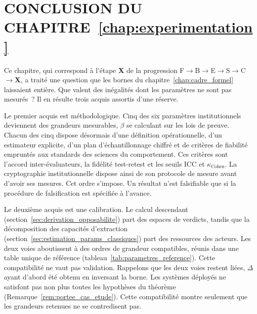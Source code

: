 
\section{CONCLUSION DU CHAPITRE~\ref{chap:experimentation}}
\label{sec:conclusion_experimentation}
\begin{sloppypar}

Ce chapitre, qui correspond \`a l'\'etape \textbf{X} de la progression
F$\to$B$\to$E$\to$S$\to$C$\to$\textbf{X}, a trait\'e une question que les bornes du
chapitre~\ref{chap:cadre_formel} laissaient enti\`ere. Que valent des
in\'egalit\'es dont les param\`etres ne sont pas mesur\'es~? Il en r\'esulte trois acquis
assortis d'une r\'eserve.

Le premier acquis est m\'ethodologique. Cinq des six param\`etres
institutionnels deviennent des grandeurs mesurables, $\beta$ se calculant sur les lois de preuve. Chacun des cinq dispose
d\'esormais d'une d\'efinition op\'erationnelle, d'un estimateur explicite,
d'un plan d'\'echantillonnage chiffr\'e et de crit\`eres de fiabilit\'e
emprunt\'es aux standards des sciences du comportement. Ces crit\`eres sont l'accord
inter-\'evaluateurs, la fid\'elit\'e test-retest et les seuils ICC et $\kappa_{\mathrm{Cohen}}$. La
cryptographie institutionnelle dispose ainsi de son protocole de mesure avant
d'avoir ses mesures. Cet ordre s'impose. Un r\'esultat n'est
falsifiable que si la proc\'edure de falsification est sp\'ecifi\'ee \`a
l'avance.

Le deuxi\`eme acquis est une calibration. Le calcul descendant
(section~\ref{sec:derivation_opposabilite}) part des espaces de verdicts, tandis
que la d\'ecomposition des capacit\'es d'extraction
(section~\ref{sec:estimation_params_classiques}) part des ressources des
acteurs. Les deux voies aboutissent \`a des ordres de grandeur compatibles, r\'eunis dans une
table unique de r\'ef\'erence (tableau~\ref{tab:parametres_reference}). Cette
compatibilit\'e ne vaut pas validation. Rappelons que les deux voies restent li\'ees, $\Delta$ ayant d'abord \'et\'e
obtenu en inversant la borne. Les syst\`emes d\'eploy\'es ne satisfont pas non plus toutes les
hypoth\`eses du th\'eor\`eme (Remarque~\ref{rem:portee_cas_etude}). Cette compatibilit\'e
montre seulement que les grandeurs retenues ne se contredisent pas.


\end{sloppypar}
